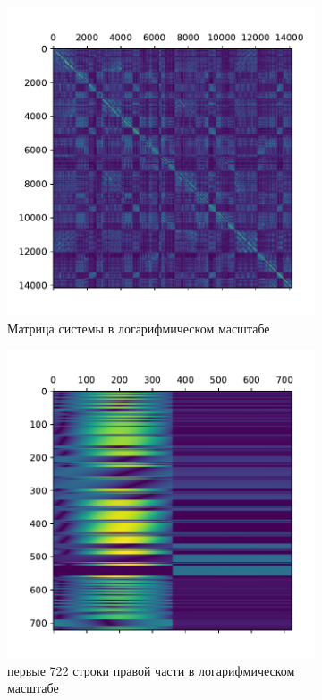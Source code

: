 \begin{figure}[H]
    \begin{subfigure}{.5\textwidth}
        \centering
        \includegraphics[width=1.0\linewidth]{images/mat.pdf}
        \caption{Матрица системы в логарифмическом масштабе}
        \label{fig:matrix}
    \end{subfigure}
    \begin{subfigure}{.5\textwidth}
        \centering
        \includegraphics[width=1.0\linewidth]{images/rhs.pdf}
        \caption{первые 722 строки правой части в логарифмическом масштабе}
        \label{fig:rhs}
    \end{subfigure}
    \caption{}
\end{figure} 
